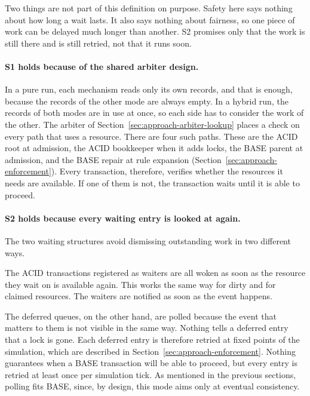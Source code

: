 Two things are not part of this definition on purpose. Safety here says nothing
about how long a wait lasts. It also says nothing about fairness, so one piece
of work can be delayed much longer than another. S2 promises only that the work
is still there and is still retried, not that it runs soon.

\paragraph{S1 holds because of the shared arbiter
  design.}\label{sec:approach-safety-defined} In a pure run, each mechanism reads
only its own records, and that is enough, because the records of the other mode
are always empty. In a hybrid run, the records of both modes are in use at once,
so each side has to consider the work of the other. The arbiter of
Section~\ref{sec:approach-arbiter-lookup} places a check on every path that
uses a resource. There are four such paths. These are the ACID root at
admission, the ACID bookkeeper when it adds locks, the BASE parent at admission,
and the BASE repair at rule expansion (Section~\ref{sec:approach-enforcement}).
Every transaction, therefore, verifies whether the resources it needs are
available. If one of them is not, the transaction waits until it is able to
proceed.

\paragraph{S2 holds because every waiting entry is looked at
  again.}\label{sec:approach-safety-progress} The two waiting structures avoid
dismissing outstanding work in two different ways.

The ACID transactions registered as waiters are all woken as soon as the
resource they wait on is available again. This works the same way for dirty and
for claimed resources. The waiters are notified as soon as
the event happens.

The deferred queues, on the other hand, are polled because the event that
matters to them is not visible in the same way. Nothing tells a deferred entry
that a lock is gone. Each deferred entry is therefore retried at fixed points of
the simulation, which are described in Section~\ref{sec:approach-enforcement}.
Nothing guarantees when a BASE transaction will be able to proceed, but every
entry is retried at least once per simulation tick. As mentioned in the previous
sections, polling fits BASE, since, by design, this mode aims only at eventual
consistency.


